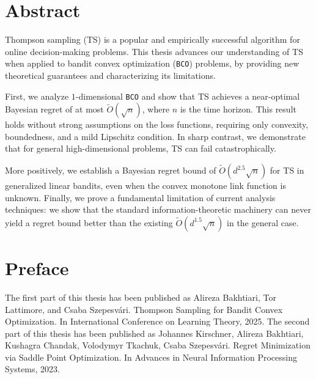 \documentclass[letter, 12pt]{report}
\newcommand{\1}{\mathbf{1}}
\newcommand{\bco}{\texttt{BCO}\xspace}
\newcommand{\ts}{\textsc{TS}\xspace}
\theoremstyle{plain}
\theoremstyle{definition}
\theoremstyle{remark}
\begin{document}
\setcounter{page}{1}
\renewcommand{\thepage}{\roman{page}} %


\doublespacing

\chapter*{Abstract}
Thompson sampling (\ts) is a popular and empirically successful algorithm for online decision-making problems.
This thesis advances our understanding of \ts when applied to bandit convex optimization (\bco) problems,
by providing new theoretical guarantees and characterizing its limitations.

First, we analyze $1$-dimensional \bco and show that \ts achieves a near-optimal Bayesian regret of at most $\tilde O(\sqrt{n})$, where $n$ is the time horizon.
This result holds without strong assumptions on the loss functions, requiring only convexity, boundedness, and a mild Lipschitz condition.
In sharp contrast, we demonstrate that for general high-dimensional problems, \ts can fail catastrophically.

More positively, we establish a Bayesian regret bound of $\tilde O(d^{2.5} \sqrt{n})$ for \ts in generalized linear bandits, even when the convex monotone link function is unknown.
Finally, we prove a fundamental limitation of current analysis techniques: we show that the standard information-theoretic machinery can never yield a regret bound better than the existing $\tilde O(d^{1.5} \sqrt{n})$ in the general case.

\setcounter{page}{2}
\renewcommand{\thepage}{\roman{page}} %

\onehalfspacing
\chapter*{Preface} 
The first part of this thesis has been published as Alireza Bakhtiari,
Tor Lattimore, and Csaba Szepesv\'ari.
Thompson Sampling for Bandit Convex Optimization.
In International Conference on Learning Theory, 2025.
The second part of this thesis has been published as
Johannes Kirschner, Alireza Bakhtiari, Kushagra Chandak, Volodymyr Tkachuk, Csaba Szepesv\'ari. Regret Minimization via Saddle Point Optimization. In Advances in Neural Information Processing Systems, 2023.
\end{document}

